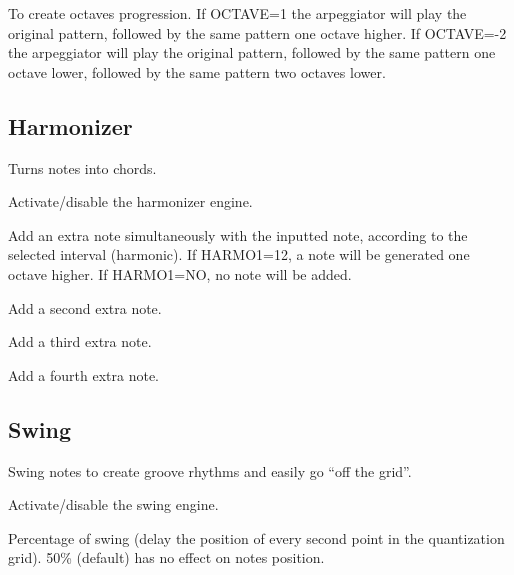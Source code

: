 To create octaves progression. If OCTAVE=1 the arpeggiator will play the original pattern, followed by the same pattern one octave higher. If OCTAVE=-2 the arpeggiator will play the original pattern, followed by the same pattern one octave lower, followed by the same pattern two octaves lower.

\subsection{Harmonizer}

Turns notes into chords.


  

Activate/disable the harmonizer engine.

  \settingopt{\ldots} 

Add an extra note simultaneously with the inputted note, according to the selected interval (harmonic). If HARMO1=12, a note will be generated one octave higher. If HARMO1=NO, no note will be added.

  \settingopt{\ldots} 

Add a second extra note.

  \settingopt{\ldots} 

Add a third extra note.

  \settingopt{\ldots} 

Add a fourth extra note.

\subsection{Swing}

Swing notes to create groove rhythms and easily go ``off the grid''.


  

Activate/disable the swing engine.

  \settingopt{\ldots} 

Percentage of swing (delay the position of every second point in the quantization grid). 50\% (default) has no effect on notes position.

